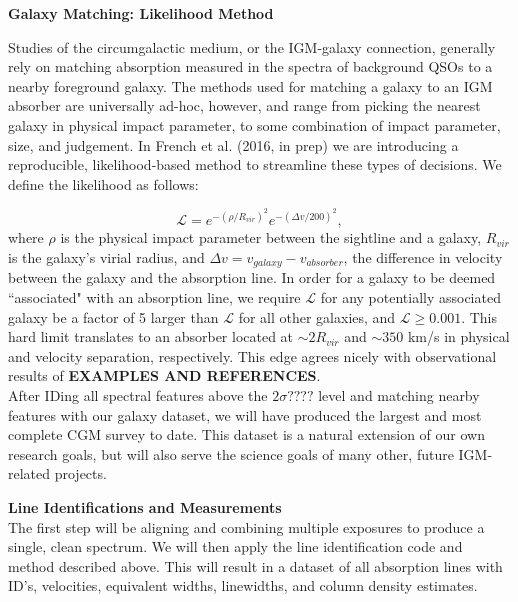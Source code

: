 \documentclass[12pt]{article}
\begin{document}
\noindent \textbf{Galaxy Matching: Likelihood Method}

Studies of the circumgalactic medium, or the IGM-galaxy connection, generally rely on matching absorption measured in the spectra of background QSOs to a nearby foreground galaxy. The methods used for matching a galaxy to an IGM absorber are universally ad-hoc, however, and range from picking the nearest galaxy in physical impact parameter, to some combination of impact parameter, size, and judgement. In French et al. (2016, in prep) we are introducing a reproducible, likelihood-based method to streamline these types of decisions. We define the likelihood as follows:

\begin{equation}
	\mathcal{L} = e^{-(\rho/R_{vir})^2} e^{-(\Delta v / 200)^2},
\end{equation}
where $\rho$ is the physical impact parameter between the sightline and a galaxy, $R_{vir}$ is the galaxy's virial radius, and $\Delta v = v_{galaxy} - v_{absorber}$, the difference in velocity between the galaxy and the absorption line. In order for a galaxy to be deemed ``associated" with an absorption line, we require $\mathcal{L}$ for any potentially associated galaxy be a factor of 5 larger than $\mathcal{L}$ for all other galaxies, and $\mathcal{L} \geq 0.001$. This hard limit translates to an absorber located at $\sim 2 R_{vir}$ and $\sim 350$ km/s in physical and velocity separation, respectively. This edge agrees nicely with observational results of \textbf{EXAMPLES AND REFERENCES}.\\



After IDing all spectral features above the $2\sigma????$ level and matching nearby features with our galaxy dataset, we will have produced the largest and most complete CGM survey to date. This dataset is a natural extension of our own research goals, but will also serve the science goals of many other, future IGM-related projects.

%
%
\describearchival       %

\textbf{Line Identifications and Measurements}\\
\indent The first step will be aligning and combining multiple exposures to produce a single, clean spectrum. We will then apply the line identification code and method described above. This will result in a dataset of all absorption lines with ID's, velocities, equivalent widths, linewidths, and column density estimates. \\
\end{document}
